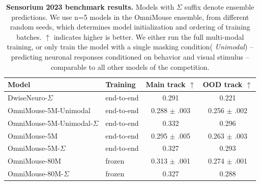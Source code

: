 \documentclass{article} %
\begin{document}
\begin{table}[]
\centering
\caption{\textbf{Sensorium 2023 benchmark results.} 
Models with $\Sigma$ suffix denote ensemble predictions. We use n=5 models in the OmniMouse ensemble, from different random seeds, which determines model initialization and ordering of training batches. $\uparrow$ indicates higher is better. We either run the full multi-modal training, or only train the model with a single masking condition( \textit{Unimodal}) -- predicting neuronal responses conditioned on behavior and visual stimulus -- comparable to all other models of the competition.
}
\vspace{3pt}
\small
\setlength{\tabcolsep}{6pt}
\begin{tabular}{@{}llcc@{}}
\toprule
\textbf{Model} & \textbf{Training} & \textbf{Main track $\uparrow$} & \textbf{OOD track $\uparrow$} \\
\midrule
DwiseNeuro-$\Sigma$ \citep{sensorium2023} & end-to-end & 0.291 & 0.221 \\
\midrule
OmniMouse-5M-Unimodal & end-to-end & 0.288 $\pm$ .003 & 0.256 $\pm$ .002 \\
OmniMouse-5M-Unimodal-$\Sigma$ & end-to-end & 0.332 & 0.296 \\
OmniMouse-5M & end-to-end & 0.295 $\pm$ .005 & 0.263 $\pm$ .003 \\
OmniMouse-5M-$\Sigma$ & end-to-end & 0.327 & 0.293 \\
OmniMouse-80M & frozen & 0.313 $\pm$ .001 & 0.274 $\pm$ .001 \\
OmniMouse-80M-$\Sigma$ & frozen & 0.327 & 0.288 \\
\bottomrule
\end{tabular}
\label{tab:sensorium_extended_results}
\end{table}

\end{document}
